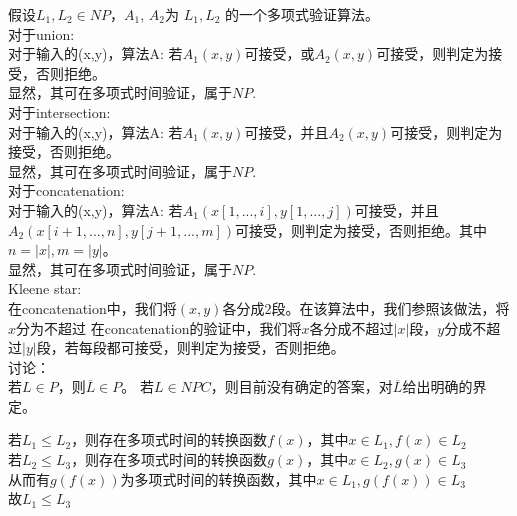 \documentclass[a4paper, justified]{tufte-handout}
\begin{document}
\begin{problem}[TC 34.2-4]
\end{problem}

\begin{solution}
  假设$L_1, L_2\in NP$，$A_1$, $A_2$为 $L_1, L_2$ 的一个多项式验证算法。\\
  对于union: \\
  对于输入的(x,y)，算法A: 若$A_1(x,y)$可接受，或$A_2(x,y)$可接受，则判定为接受，否则拒绝。\\
  显然，其可在多项式时间验证，属于$NP$.\\
  对于intersection: \\
  对于输入的(x,y)，算法A: 若$A_1(x,y)$可接受，并且$A_2(x,y)$可接受，则判定为接受，否则拒绝。\\
  显然，其可在多项式时间验证，属于$NP$.\\
  对于concatenation: \\
  对于输入的(x,y)，算法A: 若$A_1(x[1,...,i],y[1,...,j])$可接受，并且$A_2(x[i+1,...,n],y[j+1,...,m])$可接受，则判定为接受，否则拒绝。其中$n=|x|, m = |y|$。\\
  显然，其可在多项式时间验证，属于$NP$.\\
  Kleene star:\\
  在concatenation中，我们将$(x,y)$各分成$2$段。在该算法中，我们参照该做法，将$x$分为不超过
  在concatenation的验证中，我们将$x$各分成不超过$|x|$段，$y$分成不超过$|y|$段，若每段都可接受，则判定为接受，否则拒绝。\\
  讨论：\\
  若$L\in P$，则$\overline{L}\in P$。 若$L\in NPC$，则目前没有确定的答案，对$\overline{L}$给出明确的界定。
\end{solution}

\begin{problem}[TC 34.3-2]
\end{problem}

\begin{solution}
  若$L_1\leq L_2$，则存在多项式时间的转换函数$f(x)$，其中$x\in L_1, f(x) \in L_2$\\
  若$L_2\leq L_3$，则存在多项式时间的转换函数$g(x)$，其中$x\in L_2, g(x) \in L_3$\\
  从而有$g(f(x))$为多项式时间的转换函数，其中$x\in L_1, g(f(x)) \in L_3$\\
  故$L_1\leq L_3$
\end{solution}

\begin{problem}[TC 34.4-3]
\end{problem}
\end{document}
